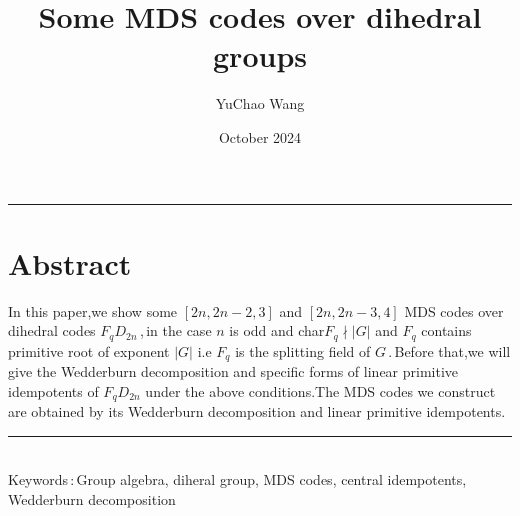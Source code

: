 \documentclass{article}
\title{Some MDS codes over dihedral groups}
\author{YuChao Wang}
\date{October 2024}
\begin{document}
\maketitle

\hrule
\section*{Abstract} 
In this paper,we show some $[2n,2n-2,3]$ and $[2n,2n-3,4]$ MDS codes over dihedral codes $F_qD_{2n}$\,,\,in the case $n$ is odd and  char$F_q$$\nmid$$\lvert G \rvert$ and $F_q$ contains primitive root of exponent $\lvert G \rvert$ i.e $F_q$ is the splitting field of $G$\,.\,Before that,we will give the Wedderburn decomposition and specific forms of linear primitive idempotents of $F_qD_{2n}$ under the above conditions.The MDS codes we construct are obtained by its Wedderburn decomposition and linear primitive idempotents.
\\
\hrule
\hspace*{\fill} \\
Keywords\,:\,Group algebra, diheral group, MDS codes, central idempotents, Wedderburn decomposition
\end{document}

